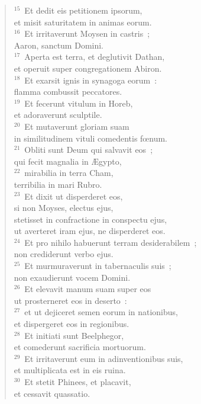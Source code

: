 \begin{verse}
${}^{15}$~Et dedit eis petitionem ipsorum,\\ et misit saturitatem in animas eorum.\\
${}^{16}$~Et irritaverunt Moysen in castris~;\\ Aaron, sanctum Domini.\\
${}^{17}$~Aperta est terra, et deglutivit Dathan,\\ et operuit super congregationem Abiron.\\
${}^{18}$~Et exarsit ignis in synagoga eorum~:\\ flamma combussit peccatores.\\
${}^{19}$~Et fecerunt vitulum in Horeb,\\ et adoraverunt sculptile.\\
${}^{20}$~Et mutaverunt gloriam suam\\ in similitudinem vituli comedentis fœnum.\\
${}^{21}$~Obliti sunt Deum qui salvavit eos~;\\ qui fecit magnalia in \AE gypto,\\
${}^{22}$~mirabilia in terra Cham,\\ terribilia in mari Rubro.\\
${}^{23}$~Et dixit ut disperderet eos,\\ si non Moyses, electus ejus,\\ stetisset in confractione in conspectu ejus,\\ ut averteret iram ejus, ne disperderet eos.\\
${}^{24}$~Et pro nihilo habuerunt terram desiderabilem~;\\ non crediderunt verbo ejus.\\
${}^{25}$~Et murmuraverunt in tabernaculis suis~;\\ non exaudierunt vocem Domini.\\
${}^{26}$~Et elevavit manum suam super eos\\ ut prosterneret eos in deserto~:\\
${}^{27}$~et ut dejiceret semen eorum in nationibus,\\ et dispergeret eos in regionibus.\\
${}^{28}$~Et initiati sunt Beelphegor,\\ et comederunt sacrificia mortuorum.\\
${}^{29}$~Et irritaverunt eum in adinventionibus suis,\\ et multiplicata est in eis ruina.\\
${}^{30}$~Et stetit Phinees, et placavit,\\ et cessavit quassatio.\\

\end{verse}
